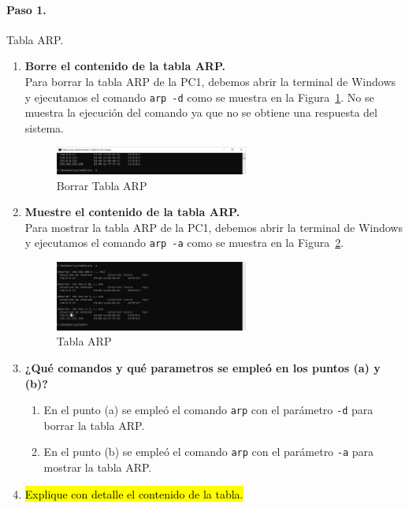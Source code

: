         \paragraph{Paso 1.}
        Tabla ARP.
        \begin{enumerate}
            \item \textbf{Borre el contenido de la tabla ARP.}\\
            Para borrar la tabla ARP de la PC1, debemos abrir la terminal de Windows y ejecutamos el comando \texttt{arp -d} como se muestra en la Figura~\ref{fig:borrar_arp}. No se muestra la ejecución del comando ya que no se obtiene una respuesta del sistema.
            \begin{figure}[H]
                \centering
                \includegraphics[width=0.6\textwidth]{img/borrar_tabla_ARP.PNG}
                \caption{Borrar Tabla ARP}
                \label{fig:borrar_arp}
            \end{figure}
            \item \textbf{Muestre el contenido de la tabla ARP.}\\
            Para mostrar la tabla ARP de la PC1, debemos abrir la terminal de Windows y ejecutamos el comando \texttt{arp -a} como se muestra en la Figura~\ref{fig:tabla_arp}.
            \begin{figure}[H]
                \centering
                \includegraphics[width=0.6\textwidth]{img/tabla_ARP.PNG}
                \caption{Tabla ARP}
                \label{fig:tabla_arp}
            \end{figure}
            \item \textbf{¿Qué comandos y qué parametros se empleó en los puntos (a) y (b)?}
            \begin{enumerate}
                \item En el punto (a) se empleó el comando \texttt{arp} con el parámetro \texttt{-d} para borrar la tabla ARP. 
                \item En el punto (b) se empleó el comando \texttt{arp} con el parámetro \texttt{-a} para mostrar la tabla ARP.
            \end{enumerate}
            \item \hl{Explique con detalle el contenido de la tabla.}
        \end{enumerate}

